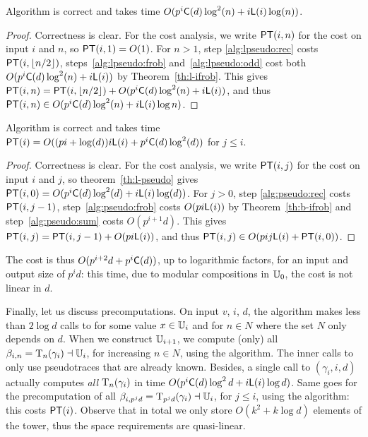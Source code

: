 \begin{theorem}
  \label{th:l-pseudo}
  Algorithm  is correct and takes time
  $O(p^i\mathrm{\sf C}(d)\log^2 (n) + i \mathsf{L}(i)\log (n))$.
\end{theorem}
\begin{proof} Correctness is clear. For the cost analysis, we write
$\mathrm{\sf PT}(i,n)$ for the cost on input $i$ and $n$, so $\mathrm{\sf PT}(i,1)=O(1)$.
For $n>1$, step \ref{alg:lpseudo:rec} costs $\mathrm{\sf PT}(i,\lfloor n/2
\rfloor)$, steps~\ref{alg:lpseudo:frob} and~\ref{alg:lpseudo:odd} cost
both $O(p^i\mathrm{\sf C}(d)\log^2 (n) + i \mathsf{L}(i))$ by
Theorem~\ref{th:l-ifrob}. This gives $\mathrm{\sf PT}(i,n) = \mathrm{\sf PT}(i,\lfloor
n/2\rfloor) +O(p^i\mathrm{\sf C}(d)\log^2 (n) + i \mathsf{L}(i))$, and thus $\mathrm{\sf PT}(i,n)
\in O(p^i\mathrm{\sf C}(d)\log^2 (n) + i \mathsf{L}(i)\log n)$.\end{proof}


\begin{theorem}
  \label{th:b-pseudo}
  Algorithm  is correct and takes time
  $\mathrm{\sf PT}(i)=O((pi+\log (d))i\mathsf{L}(i)+p^i\mathrm{\sf C}(d)\log^2 (d))$ for $j \le
  i$.
\end{theorem}
\begin{proof} Correctness is clear. For the cost analysis, we write
$\mathrm{\sf PT}(i,j)$ for the cost on input $i$ and $j$, so
theorem~\ref{th:l-pseudo} gives $\mathrm{\sf PT}(i,0)=O(p^i\mathrm{\sf C}(d)\log^2 (d) +
i \mathsf{L}(i)\log (d))$. For $j>0$, step \ref{alg:pseudo:rec} costs
$\mathrm{\sf PT}(i,j-1)$, step~\ref{alg:pseudo:frob} costs $O(p i \mathsf{L}(i))$ by
Theorem~\ref{th:b-ifrob} and step~\ref{alg:pseudo:sum} costs
$O(p^{i+1}d)$. This gives $\mathrm{\sf PT}(i,j) = \mathrm{\sf PT}(i,j-1) +O(p i \mathsf{L}(i))$, and
thus $\mathrm{\sf PT}(i,j) \in O(pij{\sf L}(i) + \mathrm{\sf PT}(i,0))$. \end{proof}

\smallskip

The cost is thus $O(p^{i+2}d+p^i\mathrm{\sf C}(d))$, up to logarithmic
factors, for an input and output size of $p^id$: this time, due to
modular compositions in $\mathbb{U}_0$, the cost is not linear in $d$.

\smallskip

Finally, let us discuss precomputations. On input $v$, $i$, $d$, the
algorithm  makes less than $2\log d$ calls to
 for some value $x\in\mathbb{U}_i$ and for
$n\in N$ where the set $N$ only depends on $d$. When we construct
$\mathbb{U}_{i+1}$, we compute (only) all $\beta_{i,n}=\operatorname{T}_{n}(\gamma_i)
\dashv\mathbb{U}_i$, for increasing $n\in N$, using the 
algorithm. The inner calls to  only use
pseudotraces that are already known. Besides, a single call to
$(\gamma_i,i,d)$ actually computes {\em all}
$\operatorname{T}_{n}(\gamma_i)$ in time $O(p^i\mathrm{\sf C}(d)\log^2 d + i \mathsf{L}(i)\log
d)$. Same goes for the precomputation of all
$\beta_{i,p^jd}=\operatorname{T}_{p^jd}(\gamma_i) \dashv\mathbb{U}_i$, for $j\le i$, using
the  algorithm: this costs $\mathrm{\sf PT}(i)$. Observe that in
total we only store $O(k^2 + k\log d)$ elements of the tower, thus the
space requirements are quasi-linear.

